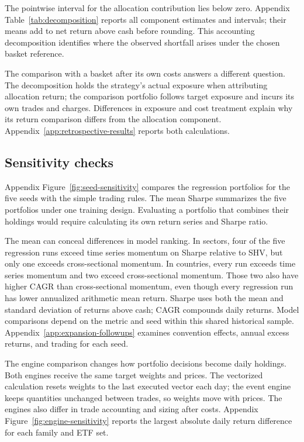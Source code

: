 \documentclass{article}
\begin{document}
The pointwise interval for the allocation contribution lies below zero. Appendix Table~\ref{tab:decomposition} reports all component estimates and intervals; their means add to net return above cash before rounding. This accounting decomposition identifies where the observed shortfall arises under the chosen basket reference.

The comparison with a basket after its own costs answers a different question. The decomposition holds the strategy's actual exposure when attributing allocation return; the comparison portfolio follows target exposure and incurs its own trades and charges. Differences in exposure and cost treatment explain why its return comparison differs from the allocation component. Appendix~\ref{app:retrospective-results} reports both calculations.

\subsection{Sensitivity checks}

Appendix Figure~\ref{fig:seed-sensitivity} compares the regression portfolios for the five seeds with the simple trading rules. The mean Sharpe summarizes the five portfolios under one training design. Evaluating a portfolio that combines their holdings would require calculating its own return series and Sharpe ratio.

The mean can conceal differences in model ranking. In sectors, four of the five regression runs exceed time series momentum on Sharpe relative to SHV, but only one exceeds cross-sectional momentum. In countries, every run exceeds time series momentum and two exceed cross-sectional momentum. Those two also have higher CAGR than cross-sectional momentum, even though every regression run has lower annualized arithmetic mean return. Sharpe uses both the mean and standard deviation of returns above cash; CAGR compounds daily returns. Model comparisons depend on the metric and seed within this shared historical sample. Appendix~\ref{app:expansion-followups} examines convention effects, annual excess returns, and trading for each seed.

The engine comparison changes how portfolio decisions become daily holdings. Both engines receive the same target weights and prices. The vectorized calculation resets weights to the last executed vector each day; the event engine keeps quantities unchanged between trades, so weights move with prices. The engines also differ in trade accounting and sizing after costs. Appendix Figure~\ref{fig:engine-sensitivity} reports the largest absolute daily return difference for each family and ETF set.
\end{document}
